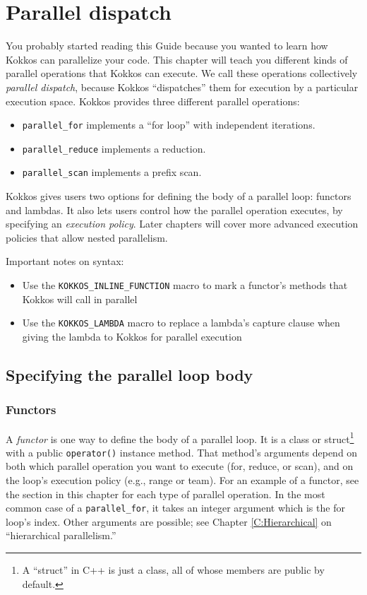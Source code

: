 \chapter{Parallel dispatch}\label{C:Dispatch}

You probably started reading this Guide because you wanted to learn
how Kokkos can parallelize your code.  This chapter will teach you
different kinds of parallel operations that Kokkos can execute.  We
call these operations collectively \emph{parallel dispatch}, because
Kokkos ``dispatches'' them for execution by a particular execution
space.  Kokkos provides three different parallel operations:
\begin{itemize}
\item \lstinline!parallel_for! implements a ``for loop'' with
  independent iterations.
\item \lstinline!parallel_reduce! implements a reduction.
\item \lstinline!parallel_scan! implements a prefix scan.
\end{itemize}
Kokkos gives users two options for defining the body of a parallel
loop: functors and lambdas.  It also lets users control how the
parallel operation executes, by specifying an \emph{execution policy}.
Later chapters will cover more advanced execution policies that allow
nested parallelism.

Important notes on syntax:
\begin{itemize}
\item Use the \lstinline!KOKKOS_INLINE_FUNCTION! macro to mark a
  functor's methods that Kokkos will call in parallel
\item Use the \lstinline!KOKKOS_LAMBDA! macro to replace a lambda's
  capture clause when giving the lambda to Kokkos for parallel
  execution
\end{itemize}

\section{Specifying the parallel loop body}

\subsection{Functors}

A \emph{functor} is one way to define the body of a parallel loop.
It is a class or struct\footnote{A ``struct'' in C++ is just a class, all of whose members are public by default.} with a public \lstinline!operator()! instance method.
That method's arguments depend on both which parallel operation you want to execute (for, reduce, or scan), and on the loop's execution policy (e.g., range or team).
For an example of a functor, see the section in this chapter for each type of parallel operation.
In the most common case of a \lstinline!parallel_for!, it takes an integer argument which is the for loop's index.
Other arguments are possible; see Chapter \ref{C:Hierarchical} on ``hierarchical parallelism.''

